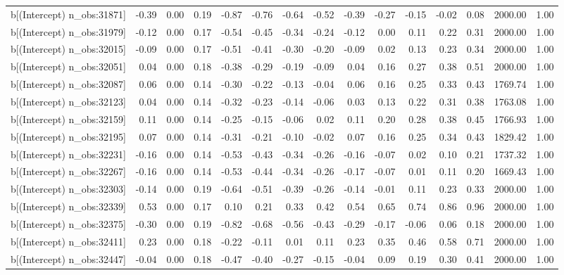 \begin{table}[ht]
\begin{tabular}{rrrrrrrrrrrrrrr}
  b[(Intercept) n\_obs:31871] & -0.39 & 0.00 & 0.19 & -0.87 & -0.76 & -0.64 & -0.52 & -0.39 & -0.27 & -0.15 & -0.02 & 0.08 & 2000.00 & 1.00 \\ 
  b[(Intercept) n\_obs:31979] & -0.12 & 0.00 & 0.17 & -0.54 & -0.45 & -0.34 & -0.24 & -0.12 & 0.00 & 0.11 & 0.22 & 0.31 & 2000.00 & 1.00 \\ 
  b[(Intercept) n\_obs:32015] & -0.09 & 0.00 & 0.17 & -0.51 & -0.41 & -0.30 & -0.20 & -0.09 & 0.02 & 0.13 & 0.23 & 0.34 & 2000.00 & 1.00 \\ 
  b[(Intercept) n\_obs:32051] & 0.04 & 0.00 & 0.18 & -0.38 & -0.29 & -0.19 & -0.09 & 0.04 & 0.16 & 0.27 & 0.38 & 0.51 & 2000.00 & 1.00 \\ 
  b[(Intercept) n\_obs:32087] & 0.06 & 0.00 & 0.14 & -0.30 & -0.22 & -0.13 & -0.04 & 0.06 & 0.16 & 0.25 & 0.33 & 0.43 & 1769.74 & 1.00 \\ 
  b[(Intercept) n\_obs:32123] & 0.04 & 0.00 & 0.14 & -0.32 & -0.23 & -0.14 & -0.06 & 0.03 & 0.13 & 0.22 & 0.31 & 0.38 & 1763.08 & 1.00 \\ 
  b[(Intercept) n\_obs:32159] & 0.11 & 0.00 & 0.14 & -0.25 & -0.15 & -0.06 & 0.02 & 0.11 & 0.20 & 0.28 & 0.38 & 0.45 & 1766.93 & 1.00 \\ 
  b[(Intercept) n\_obs:32195] & 0.07 & 0.00 & 0.14 & -0.31 & -0.21 & -0.10 & -0.02 & 0.07 & 0.16 & 0.25 & 0.34 & 0.43 & 1829.42 & 1.00 \\ 
  b[(Intercept) n\_obs:32231] & -0.16 & 0.00 & 0.14 & -0.53 & -0.43 & -0.34 & -0.26 & -0.16 & -0.07 & 0.02 & 0.10 & 0.21 & 1737.32 & 1.00 \\ 
  b[(Intercept) n\_obs:32267] & -0.16 & 0.00 & 0.14 & -0.53 & -0.44 & -0.34 & -0.26 & -0.17 & -0.07 & 0.01 & 0.11 & 0.20 & 1669.43 & 1.00 \\ 
  b[(Intercept) n\_obs:32303] & -0.14 & 0.00 & 0.19 & -0.64 & -0.51 & -0.39 & -0.26 & -0.14 & -0.01 & 0.11 & 0.23 & 0.33 & 2000.00 & 1.00 \\ 
  b[(Intercept) n\_obs:32339] & 0.53 & 0.00 & 0.17 & 0.10 & 0.21 & 0.33 & 0.42 & 0.54 & 0.65 & 0.74 & 0.86 & 0.96 & 2000.00 & 1.00 \\ 
  b[(Intercept) n\_obs:32375] & -0.30 & 0.00 & 0.19 & -0.82 & -0.68 & -0.56 & -0.43 & -0.29 & -0.17 & -0.06 & 0.06 & 0.18 & 2000.00 & 1.00 \\ 
  b[(Intercept) n\_obs:32411] & 0.23 & 0.00 & 0.18 & -0.22 & -0.11 & 0.01 & 0.11 & 0.23 & 0.35 & 0.46 & 0.58 & 0.71 & 2000.00 & 1.00 \\ 
  b[(Intercept) n\_obs:32447] & -0.04 & 0.00 & 0.18 & -0.47 & -0.40 & -0.27 & -0.15 & -0.04 & 0.09 & 0.19 & 0.30 & 0.41 & 2000.00 & 1.00 \\ 

\end{tabular}
\end{table}
